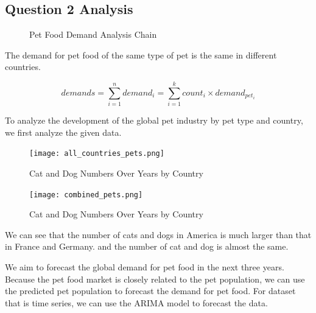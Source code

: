 \documentclass[withoutpreface,bwprint]{cumcmthesis} %
\begin{document}
\subsection{Question 2 Analysis}
\usetikzlibrary{positioning}
\begin{figure}[htbp]
    \centering
    \caption{Pet Food Demand Analysis Chain}
\end{figure}
\begin{assumption}
    The demand for pet food of the same type of pet is the same in different countries.
\end{assumption}
 \[demands=\sum_{i=1}^{n} demand_i=\sum_{i=1}^{k} count_i \times demand_{pet_i}\]
\par To analyze the development of the global pet industry by pet type and country,
we first analyze the given data.
\clearpage
\begin{figure}[htbp]
	\centering
	\texttt{[image: all\_countries\_pets.png]}
	\caption{Cat and Dog Numbers Over Years by Country}
\end{figure}
\begin{figure}[htbp]
	\centering
	\texttt{[image: combined\_pets.png]}
	\caption{Cat and Dog Numbers Over Years by Country}
\end{figure}
\par We can see that the number of cats and dogs in America is much larger than that in France and Germany.
and the number of cat and dog is almost the same.
\par We aim to forecast the global demand for pet food in the next three years.
Because the pet food market is closely related to the pet population, we can use the predicted pet population to forecast the demand for pet food.
For dataset that is time series, we can use the ARIMA model to forecast the data.
\end{document}
